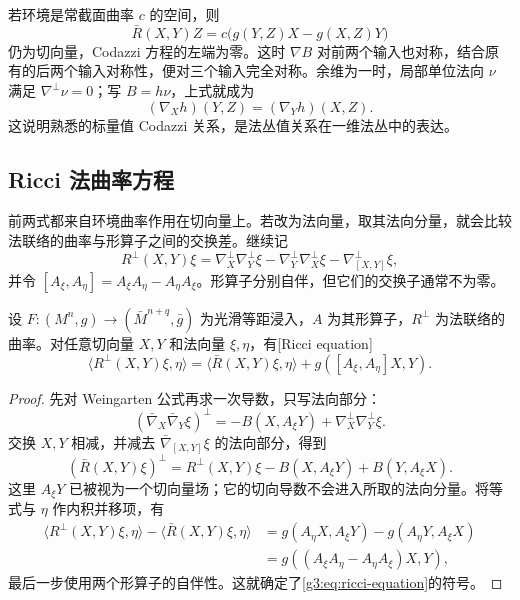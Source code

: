 若环境是常截面曲率 \(c\) 的空间，则
\[
	\bar R(X,Y)Z=c\bigl(g(Y,Z)X-g(X,Z)Y\bigr)
\]
仍为切向量，Codazzi 方程的左端为零。这时 \(\nabla B\) 对前两个输入也对称，结合原有的后两个输入对称性，便对三个输入完全对称。余维为一时，局部单位法向 \(\nu\) 满足 \(\nabla^\perp\nu=0\)；写 \(B=h\nu\)，上式就成为
\[
	(\nabla_Xh)(Y,Z)=(\nabla_Yh)(X,Z).
\]
这说明熟悉的标量值 Codazzi 关系，是法丛值关系在一维法丛中的表达。

\subsection{Ricci 法曲率方程}
\label{g3:subsec:0402:03}

前两式都来自环境曲率作用在切向量上。若改为法向量，取其法向分量，就会比较法联络的曲率与形算子之间的交换差。继续记
\[
	R^\perp(X,Y)\xi
	=\nabla_X^\perp\nabla_Y^\perp\xi
	-\nabla_Y^\perp\nabla_X^\perp\xi
	-\nabla_{[X,Y]}^\perp\xi,
\]
并令 \([A_\xi,A_\eta]=A_\xi A_\eta-A_\eta A_\xi\)。形算子分别自伴，但它们的交换子通常不为零。

\begin{theorem}\label{g3:thm:ricci-equation}
	设 \(F\colon(M^n,g)\to(\bar M^{n+q},\bar g)\) 为光滑等距浸入，\(A\) 为其形算子，\(R^\perp\) 为法联络的曲率。对任意切向量 \(X,Y\) 和法向量 \(\xi,\eta\)，有[Ricci equation]
	\begin{equation}\label{g3:eq:ricci-equation}
		\langle R^\perp(X,Y)\xi,\eta\rangle
		=\langle\bar R(X,Y)\xi,\eta\rangle
		+g([A_\xi,A_\eta]X,Y).
	\end{equation}
\end{theorem}
\begin{proof}
	先对 Weingarten 公式再求一次导数，只写法向部分：
	\[
		(\bar\nabla_X\bar\nabla_Y\xi)^\perp
		=-B(X,A_\xi Y)+\nabla_X^\perp\nabla_Y^\perp\xi.
	\]
	交换 \(X,Y\) 相减，并减去 \(\bar\nabla_{[X,Y]}\xi\) 的法向部分，得到
	\begin{equation}\label{g3:eq:ricci-vector-equation}
		(\bar R(X,Y)\xi)^\perp
		=R^\perp(X,Y)\xi-B(X,A_\xi Y)+B(Y,A_\xi X).
	\end{equation}
	这里 \(A_\xi Y\) 已被视为一个切向量场；它的切向导数不会进入所取的法向分量。将等式与 \(\eta\) 作内积并移项，有
	\[
		\begin{aligned}
		\langle R^\perp(X,Y)\xi,\eta\rangle
		-\langle\bar R(X,Y)\xi,\eta\rangle
		&=g(A_\eta X,A_\xi Y)-g(A_\eta Y,A_\xi X)\\
		&=g((A_\xi A_\eta-A_\eta A_\xi)X,Y),
		\end{aligned}
	\]
	最后一步使用两个形算子的自伴性。这就确定了\eqref{g3:eq:ricci-equation}的符号。
\end{proof}

